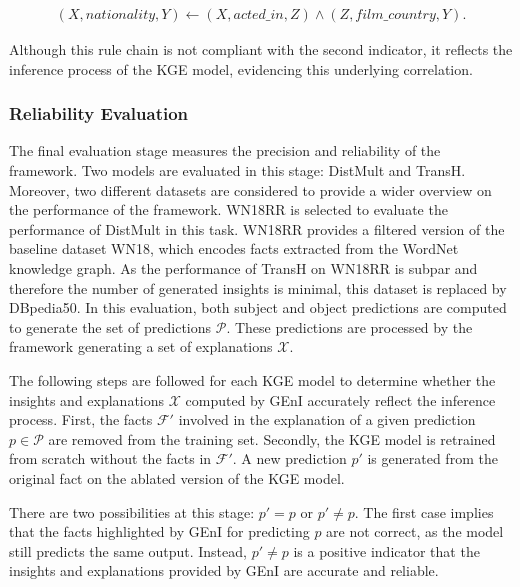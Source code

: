 \begin{align}
    (X, nationality, Y) \leftarrow (X, acted\_in, Z) \wedge (Z, film\_country, Y). 
\end{align}


Although this rule chain is not compliant with the second indicator, it reflects the inference process of the KGE model, evidencing this underlying correlation. 

\subsubsection{Reliability Evaluation}
The final evaluation stage measures the precision and reliability of the framework. Two models are evaluated in this stage: DistMult and TransH. Moreover, two different datasets are considered to provide a wider overview on the performance of the framework. WN18RR is selected to evaluate the performance of DistMult in this task. WN18RR provides a filtered version of the baseline dataset WN18, which encodes facts extracted from the WordNet knowledge graph. As the performance of TransH on WN18RR is subpar and therefore the number of generated insights is minimal, this dataset is replaced by DBpedia50. In this evaluation, both subject and object predictions are computed to generate the set of predictions $\mathcal{P}$. These predictions are processed by the framework generating a set of explanations $\mathcal{X}$. 

The following steps are followed for each KGE model to determine whether the insights and explanations $\mathcal{X}$ computed by GEnI accurately reflect the inference process. First, the facts $\mathcal{F}'$ involved in the explanation of a given prediction $p \in \mathcal{P}$ are removed from the training set. Secondly, the KGE model is retrained from scratch without the facts in $\mathcal{F}'$. A new prediction $p'$ is generated from the original fact on the ablated version of the KGE model. 

There are two possibilities at this stage: $p'= p$ or $p' \neq p$. The first case implies that the facts highlighted by GEnI for predicting $p$ are not correct, as the model still predicts the same output. Instead, $p' \neq p$ is a positive indicator that the insights and explanations provided by GEnI are accurate and reliable. 

